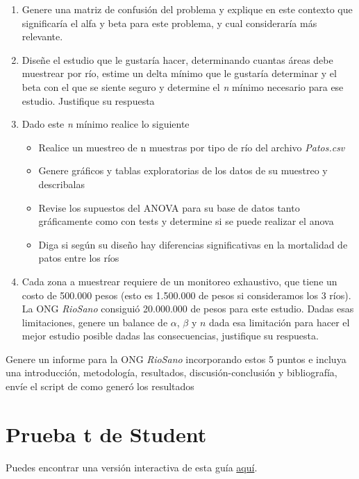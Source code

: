 \documentclass[]{book}
\providecommand{\tightlist}{%
  \setlength{\itemsep}{0pt}\setlength{\parskip}{0pt}}
\begin{document}
\begin{enumerate}
\def\labelenumi{\arabic{enumi}.}
\item
  Genere una matriz de confusión del problema y explique en este contexto que significaría el alfa y beta para este problema, y cual consideraría más relevante.
\item
  Diseñe el estudio que le gustaría hacer, determinando cuantas áreas debe muestrear por río, estime un delta mínimo que le gustaría determinar y el beta con el que se siente seguro y determine el \emph{n} mínimo necesario para ese estudio. Justifique su respuesta
\item
  Dado este \emph{n} mínimo realice lo siguiente

  \begin{itemize}
  \tightlist
  \item
    Realice un muestreo de n muestras por tipo de río del archivo \emph{Patos.csv}
  \item
    Genere gráficos y tablas exploratorias de los datos de su muestreo y describalas
  \item
    Revise los supuestos del ANOVA para su base de datos tanto gráficamente como con tests y determine si se puede realizar el anova
  \item
    Diga si según su diseño hay diferencias significativas en la mortalidad de patos entre los ríos
  \end{itemize}
\item
  Cada zona a muestrear requiere de un monitoreo exhaustivo, que tiene un costo de 500.000 pesos (esto es 1.500.000 de pesos si consideramos los 3 ríos). La ONG \emph{RioSano} consiguió 20.000.000 de pesos para este estudio. Dadas esas limitaciones, genere un balance de \(\alpha\), \(\beta\) y \(n\) dada esa limitación para hacer el mejor estudio posible dadas las consecuencias, justifique su respuesta.
\end{enumerate}

Genere un informe para la ONG \emph{RioSano} incorporando estos 5 puntos e incluya una introducción, metodología, resultados, discusión-conclusión y bibliografía, envíe el script de como generó los resultados

\hypertarget{t-student}{%
\chapter{Prueba t de Student}\label{t-student}}

Puedes encontrar una versión interactiva de esta guía \href{http://admin.derek-corcoran-barrios.com/shiny/rstudio/sample-apps/Interactivo5/}{aquí}.
\end{document}
